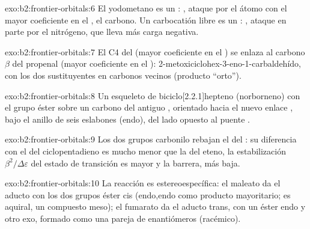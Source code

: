 \begin{solution}{exo:b2:frontier-orbitals:6}
El yodometano es un : , ataque por el átomo con el mayor
coeficiente en el , el carbono. Un carbocatión libre es un : ,
ataque en parte por el nitrógeno, que lleva más carga negativa.
\end{solution}

\begin{solution}{exo:b2:frontier-orbitals:7}
El C4 del  (mayor coeficiente en el ) se enlaza al carbono $\beta$ del propenal (mayor
coeficiente en el ): 2-metoxiciclohex-3-eno-1-carbaldehído, con los dos sustituyentes en
carbonos vecinos (producto ``orto'').
\end{solution}

\begin{solution}{exo:b2:frontier-orbitals:8}
Un esqueleto de biciclo[2.2.1]hepteno (norborneno) con el grupo éster sobre un carbono del
antiguo , orientado hacia el nuevo enlace , bajo el anillo de seis eslabones
(endo), del lado opuesto al puente .
\end{solution}

\begin{solution}{exo:b2:frontier-orbitals:9}
Los dos grupos carbonilo rebajan el  del : su diferencia con el  del
ciclopentadieno es mucho menor que la del eteno, la estabilización $\beta^2/\Delta\varepsilon$ del
estado de transición es mayor y la barrera, más baja.
\end{solution}

\begin{solution}{exo:b2:frontier-orbitals:10}
La reacción es estereoespecífica: el maleato da el aducto con los dos grupos éster cis
(endo,endo como producto mayoritario; es aquiral, un compuesto meso); el fumarato da el
aducto trans, con un éster endo y otro exo, formado como una pareja de enantiómeros (racémico).
\end{solution}

